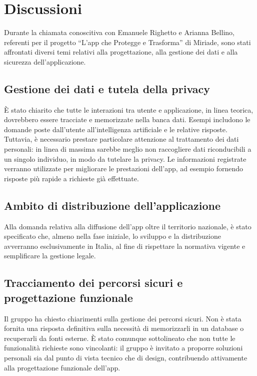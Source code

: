 \documentclass[a4paper,12pt]{article}
\begin{document}
\section{Discussioni}
Durante la chiamata conoscitiva con Emanuele Righetto e Arianna Bellino, referenti per il progetto “L’app che Protegge e Trasforma” di Miriade, sono stati affrontati diversi temi relativi alla progettazione, alla gestione dei dati e alla sicurezza dell’applicazione.

\subsection{Gestione dei dati e tutela della privacy}
È stato chiarito che tutte le interazioni tra utente e applicazione, in linea teorica, dovrebbero essere tracciate e memorizzate nella banca dati.  
Esempi includono le domande poste dall’utente all’intelligenza artificiale e le relative risposte. Tuttavia, è necessario prestare particolare attenzione al trattamento dei dati personali: in linea di massima sarebbe meglio non raccogliere dati riconducibili a un singolo individuo, in modo da tutelare la privacy.  
Le informazioni registrate verranno utilizzate per migliorare le prestazioni dell’app, ad esempio fornendo risposte più rapide a richieste già effettuate.

\subsection{Ambito di distribuzione dell’applicazione}
Alla domanda relativa alla diffusione dell’app oltre il territorio nazionale, è stato specificato che, almeno nella fase iniziale, lo sviluppo e la distribuzione avverranno esclusivamente in Italia, al fine di rispettare la normativa vigente e semplificare la gestione legale.

\subsection{Tracciamento dei percorsi sicuri e progettazione funzionale}
Il gruppo ha chiesto chiarimenti sulla gestione dei percorsi sicuri. Non è stata fornita una risposta definitiva sulla necessità di memorizzarli in un database o recuperarli da fonti esterne.  
È stato comunque sottolineato che non tutte le funzionalità richieste sono vincolanti: il gruppo è invitato a proporre soluzioni personali sia dal punto di vista tecnico che di design, contribuendo attivamente alla progettazione funzionale dell’app.
\end{document}
